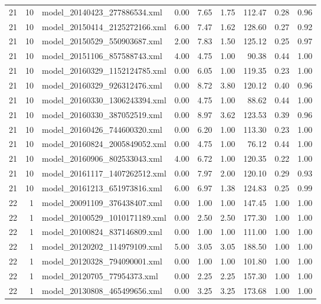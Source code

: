 \begin{table}[ht]
\begin{tabular}{rrlrrrrrr}
   21 &  10 & model\_20140423\_277886534.xml & 0.00 & 7.65 & 1.75 & 112.47 & 0.28 & 0.96 \\ 
   21 &  10 & model\_20150414\_2125272166.xml & 6.00 & 7.47 & 1.62 & 128.60 & 0.27 & 0.92 \\ 
   21 &  10 & model\_20150529\_550903687.xml & 2.00 & 7.83 & 1.50 & 125.12 & 0.25 & 0.97 \\ 
   21 &  10 & model\_20151106\_857588743.xml & 4.00 & 4.75 & 1.00 & 90.38 & 0.44 & 1.00 \\ 
   21 &  10 & model\_20160329\_1152124785.xml & 0.00 & 6.05 & 1.00 & 119.35 & 0.23 & 1.00 \\ 
   21 &  10 & model\_20160329\_926312476.xml & 0.00 & 8.72 & 3.80 & 120.12 & 0.40 & 0.96 \\ 
   21 &  10 & model\_20160330\_1306243394.xml & 0.00 & 4.75 & 1.00 & 88.62 & 0.44 & 1.00 \\ 
   21 &  10 & model\_20160330\_387052519.xml & 0.00 & 8.97 & 3.62 & 123.53 & 0.39 & 0.96 \\ 
   21 &  10 & model\_20160426\_744600320.xml & 0.00 & 6.20 & 1.00 & 113.30 & 0.23 & 1.00 \\ 
   21 &  10 & model\_20160824\_2005849052.xml & 0.00 & 4.75 & 1.00 & 76.12 & 0.44 & 1.00 \\ 
   21 &  10 & model\_20160906\_802533043.xml & 4.00 & 6.72 & 1.00 & 120.35 & 0.22 & 1.00 \\ 
   21 &  10 & model\_20161117\_1407262512.xml & 0.00 & 7.97 & 2.00 & 120.10 & 0.29 & 0.93 \\ 
   21 &  10 & model\_20161213\_651973816.xml & 6.00 & 6.97 & 1.38 & 124.83 & 0.25 & 0.99 \\ 
   22 &   1 & model\_20091109\_376438407.xml & 0.00 & 1.00 & 1.00 & 147.45 & 1.00 & 1.00 \\ 
   22 &   1 & model\_20100529\_1010171189.xml & 0.00 & 2.50 & 2.50 & 177.30 & 1.00 & 1.00 \\ 
   22 &   1 & model\_20100824\_837146809.xml & 0.00 & 1.00 & 1.00 & 111.00 & 1.00 & 1.00 \\ 
   22 &   1 & model\_20120202\_114979109.xml & 5.00 & 3.05 & 3.05 & 188.50 & 1.00 & 1.00 \\ 
   22 &   1 & model\_20120328\_794090001.xml & 0.00 & 1.00 & 1.00 & 101.80 & 1.00 & 1.00 \\ 
   22 &   1 & model\_20120705\_77954373.xml & 0.00 & 2.25 & 2.25 & 157.30 & 1.00 & 1.00 \\ 
   22 &   1 & model\_20130808\_465499656.xml & 0.00 & 3.25 & 3.25 & 173.68 & 1.00 & 1.00 \\ 

\end{tabular}
\end{table}
